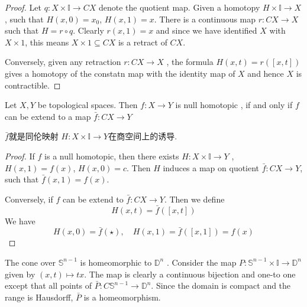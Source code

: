 \documentclass[../main.tex]{subfiles}
\begin{document}
\begin{proof}
    Let \(  q:X\times \mathbb{I}\to CX  \) denote the quotient map. Given a homotopy \(  H\times \mathbb{I}\to X  \), such that \(  H\left( x,0 \right)= x_0   \), \(  H\left( x,1 \right)= x   \). There is a continuous map \(  r:CX\to X  \) such that \(  H= r\circ q  \). Clearly \(  r\left( x,1 \right)= x   \) and since we have identified \(  X  \) with \(  X\times 1  \), this means \(  X\times 1\subseteq CX  \) is a retract of \(  CX  \).
    
    Conversely, given any retraction \(  r:CX\to X  \) , the formula \(  H\left( x,t \right)= r\left( [x,t] \right)    \) gives a homotopy of the constatn map with the identity map of \(  X  \) and hence \(  X  \) is contractible.    
\end{proof}

\begin{theorem}{}{}
    Let \(  X,Y  \) be topological spaces. Then \(  f:X\to Y  \) is null   homotopic , if and only if \(  f  \) can be extend to  a map \(  \bar{f}:CX\to Y  \) 
\end{theorem}

\begin{proofsketch}
    \(  \bar{f}  \)就是同伦映射 \(  H: X\times \mathbb{I}\to Y  \)在商空间上的诱导. 
\end{proofsketch}

\begin{proof}
    If \(  f   \) is a null homotopic, then there exists \(  H:X\times \mathbb{I}\to Y  \) , \(  H\left( x,1 \right)= f\left( x \right)    \), \(  H\left( x,0 \right)= c   \). Then \(  H  \) induces a map on quotient \( \bar{f}:CX\to Y  \), such that \(  \bar{f}\left( x,1 \right)= f\left( x \right)    \). 

    Conversely, if \(  f  \) can be extend to \(  \bar{f}:CX\to Y  \). Then we define \[
    H\left( x,t \right)= \bar{f}\left( [x,t] \right)  
    \] We have \[
    H\left( x,0 \right)= \bar{f}\left( \star \right),\quad H\left( x,1 \right)= \bar{f}\left( [x,1] \right)= f\left( x \right)     
    \]  
\end{proof}

\begin{example}{}{}
    The cone over \(  \mathbb{S}^{n-1}  \) is homeomorphic to \(  \mathbb{D}^{n}  \)  . Consider the map \(  P:\mathbb{S}^{n-1}\times \mathbb{I}\to \mathbb{D}^{n}  \) given by \(  \left( x,t \right)\mapsto tx   \). The map is clearly a continuous bijection and one-to one except that all points of \(  \bar{P}:C\mathbb{S}^{n-1}\to \mathbb{D}^{n}  \).   Since the domain is compact and the range is Hausdorff, \(  \bar{P}  \) is a homeomorphism.

\end{example}
\end{document}
